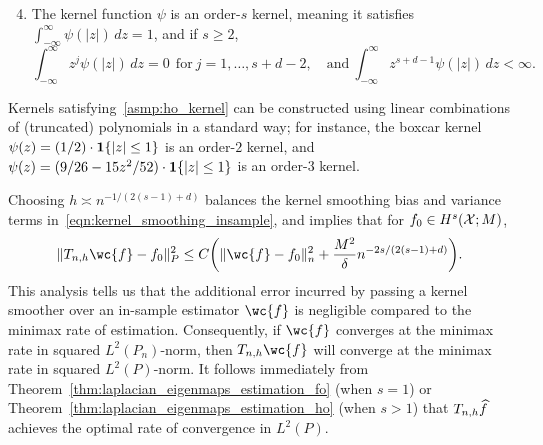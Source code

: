\begin{enumerate}[label=(K\arabic*)]
	\setcounter{enumi}{3}
	\item
	\label{asmp:ho_kernel}
	The kernel function $\psi$ is an order-$s$ kernel, meaning it satisfies $\int_{-\infty}^{\infty} \psi(|z|) \,dz = 1$, and if $s \geq 2$,
	\begin{equation*}
	\int_{-\infty}^{\infty} z^j \psi(|z|) \,dz = 0 ~~\textrm{for}~j = 1,\ldots, s + d - 2, \quad \textrm{and}~ \int_{-\infty}^{\infty} z^{s + d - 1} \psi(|z|) \,dz < \infty. 
	\end{equation*}
\end{enumerate}
Kernels satisfying~\ref{asmp:ho_kernel} can be constructed using linear combinations of (truncated) polynomials in a standard way; for instance, the boxcar kernel $\psi(z) = (1/2)\cdot\mathbf{1}\{|z| \leq 1\}$ is an order-$2$ kernel, and $\psi(z) = (9/26 - 15z^2/52)\cdot\mathbf{1}\{|z| \leq 1\}$ is an order-$3$ kernel.

Choosing $h \asymp n^{-1/(2(s - 1) + d)}$ balances the kernel smoothing bias and variance terms in~\eqref{eqn:kernel_smoothing_insample}, and implies that for $f_0 \in H^s(\mathcal{X};M)$,
\begin{equation}
\label{eqn:kernel_smoothing_insample2}
\|T_{n,h}\wc{f} - f_0\|_P^2 \leq C\biggl(\|\wc{f} - f_0\|_n^2 + \frac{M^2}{\delta}n^{-2s/(2(s - 1) + d)}\biggr).
\end{equation}
This analysis tells us that the additional error incurred by passing a kernel smoother over an in-sample estimator $\wc{f}$ is negligible compared to the minimax rate of estimation. Consequently, if $\wc{f}$ converges at the minimax rate in squared $L^2(P_n)$-norm, then $T_{n,h}\wc{f}$ will converge at the minimax rate in squared $L^2(P)$-norm. It follows immediately from Theorem~\ref{thm:laplacian_eigenmaps_estimation_fo} (when $s = 1$) or Theorem~\ref{thm:laplacian_eigenmaps_estimation_ho} (when $s > 1$) that $T_{n,h}\widehat{f}$ achieves the optimal rate of convergence in $L^2(P)$.

